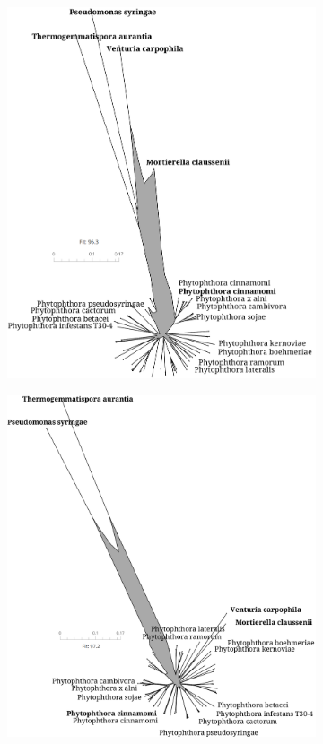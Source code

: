 \begin{figure}
  \centering
  \begin{subfigure}{0.49\textwidth}
    \includegraphics[width=1.0\textwidth]{figures/mashtree_avocado4-1_k21_s2000.png}
  \end{subfigure}
  \begin{subfigure}{0.49\textwidth}
    \includegraphics[width=1.0\textwidth]{figures/fmhdist_avocado4-1_k21_s2000.png}

\end{subfigure}
\end{figure}

